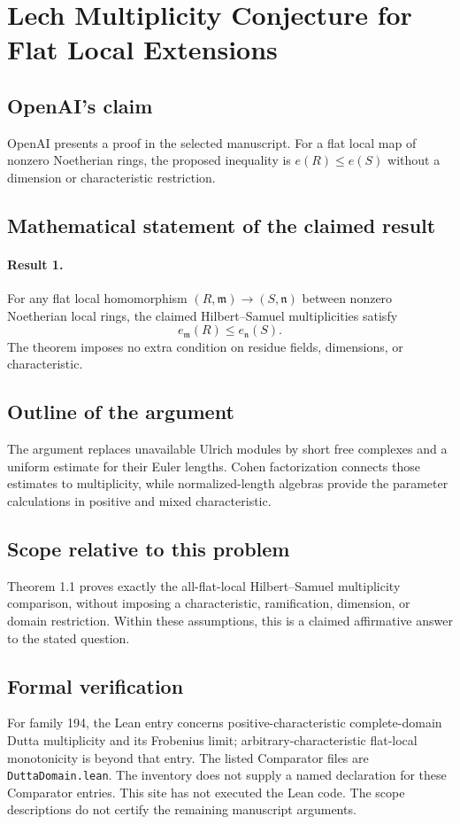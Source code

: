 \documentclass[11pt]{article}
\begin{document}
\section*{Lech Multiplicity Conjecture for Flat Local Extensions}

\subsection{OpenAI's claim}
OpenAI presents a proof in the selected manuscript. For a flat local map of nonzero Noetherian rings, the proposed inequality is $e(R)\leq e(S)$ without a dimension or characteristic restriction.

\subsection{Mathematical statement of the claimed result}
\paragraph{Result 1.} For any flat local homomorphism \((R,\mathfrak m)\to(S,\mathfrak n)\) between nonzero Noetherian local rings, the claimed Hilbert--Samuel multiplicities satisfy
\[
 e_{\mathfrak m}(R)\le e_{\mathfrak n}(S).
\]
The theorem imposes no extra condition on residue fields, dimensions, or characteristic.

\subsection{Outline of the argument}
The argument replaces unavailable Ulrich modules by short free complexes and a uniform estimate for their Euler lengths. Cohen factorization connects those estimates to multiplicity, while normalized-length algebras provide the parameter calculations in positive and mixed characteristic.

\subsection{Scope relative to this problem}
Theorem 1.1 proves exactly the all-flat-local Hilbert–Samuel multiplicity comparison, without imposing a characteristic, ramification, dimension, or domain restriction. Within these assumptions, this is a claimed affirmative answer to the stated question.

\subsection{Formal verification}
For family 194, the Lean entry concerns positive-characteristic complete-domain Dutta multiplicity and its Frobenius limit; arbitrary-characteristic flat-local monotonicity is beyond that entry. The listed Comparator files are \texttt{DuttaDomain.lean}. The inventory does not supply a named declaration for these Comparator entries. This site has not executed the Lean code. The scope descriptions do not certify the remaining manuscript arguments.
\end{document}
